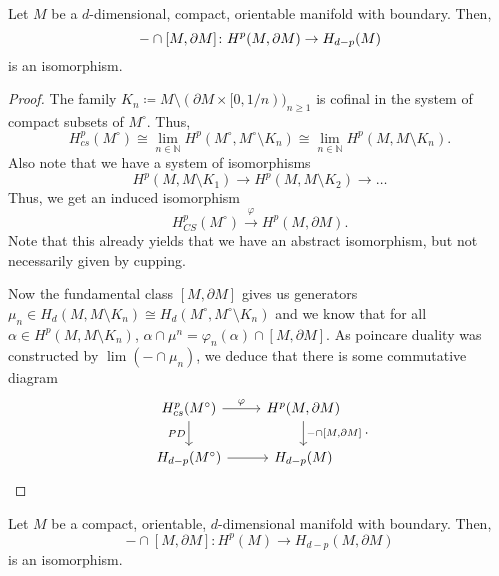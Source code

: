 \begin{theorem}
  Let $M$ be a $d$-dimensional, compact, orientable manifold with boundary.
  Then,
  \[
    - \cap [M, \partial M]\colon H^p(M, \partial M) \to H_{d-p}(M)
  \]
  is an isomorphism.
\end{theorem}

\begin{proof}
  The family $K_n \coloneqq M \setminus (\partial M \times [0, 1/n))_{n\geq 1}$
  is cofinal in the system of compact subsets of $M^{\circ}$.
  Thus,
  \[
    H_{cs}^p(M^{\circ})
    \cong
    \lim_{n\in \mathbb{N}} H^p(M^{\circ}, M^{\circ} \setminus K_n)
    \cong
    \lim_{n\in \mathbb{N}} H^p(M, M\setminus K_n)
  .\]
  Also note that we have a system of isomorphisms
  \[
    H^p(M, M\setminus K_1) \to H^p(M, M\setminus K_2) \to \ldots
  \]
  Thus, we get an induced isomorphism
  \[
    H_{CS}^p(M^{\circ})
    \xrightarrow{\varphi }
    H^p(M, \partial M)
  .\]
  Note that this already yields that we have an abstract
  isomorphism, but not necessarily given by cupping.

  Now the fundamental class $[M, \partial M]$ gives us
  generators $μ_n \in H_d(M, M\setminus K_n)
  \cong H_d (M^{\circ}, M^{\circ} \setminus K_n)$
  and we know that for all $α\in H^p(M, M\setminus K_n)$,
  $α \cap μ^n = \varphi _n(α) \cap [M, \partial M]$.
  As poincare duality was constructed by $\lim (- \cap μ_n)$,
  we deduce that there is some commutative diagram
  \[
    \begin{tikzcd}
      H_{cs}^p (M^{\circ})
      \ar[swap]{d}{PD}
      \ar{r}{\varphi }
      &
      H^p(M, \partial M)
      \ar{d}{- \cap [M, \partial M]}
      \\
      H_{d-p}(M^{\circ})
      \ar[swap]{r}{}
      &
      H_{d-p}(M)
    \end{tikzcd}
  .\]
\end{proof}

\begin{theorem}
  Let $M$ be a compact, orientable, $d$-dimensional manifold
  with boundary.
  Then,
  \[
    - \cap [M, \partial M] \colon H^p(M) \to H_{d-p}(M, \partial M)
  \]
  is an isomorphism.
\end{theorem}

